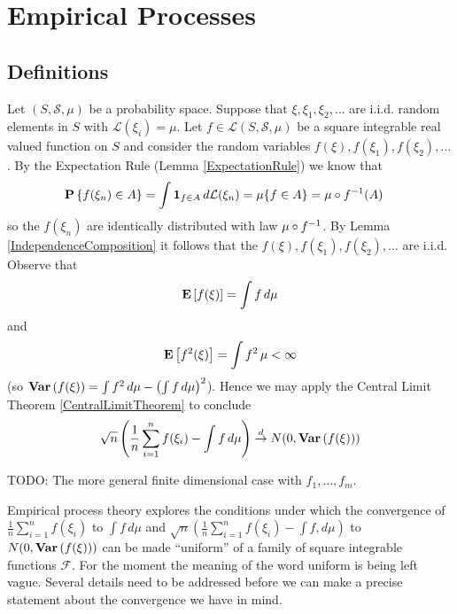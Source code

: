 \chapter{Empirical Processes}

\section{Definitions}

Let $(S, \mathcal{S}, \mu)$ be a probability space.  Suppose that $\xi, \xi_1, \xi_2, \dotsc$ are i.i.d. random elements in $S$ with $\mathcal{L}(\xi_i) = \mu$.  Let $f \in \mathcal{L}(S, \mathcal{S}, \mu)$ be a square integrable real valued function on $S$ and consider the random variables $f(\xi), f(\xi_1), f(\xi_2), \dotsc$.  By the Expectation Rule (Lemma \ref{ExpectationRule}) we know that 
\begin{align*}
\textbf{P}\left \{f(\xi_n) \in A \right \} &= \int \textbf{1}_{f \in A} \, d\mathcal{L}(\xi_n) = \mu \lbrace f \in A \rbrace = \mu \circ f^{-1}(A)
\end{align*}
so the $f(\xi_n)$ are identically distributed with law $\mu \circ f^{-1}$.  By Lemma \ref{IndependenceComposition} it follows that the $f(\xi), f(\xi_1), f(\xi_2), \dotsc$ are i.i.d.  Observe that 
\begin{align*}
\textbf{E}\left[f(\xi)\right] = \int f \, d\mu 
\end{align*}
and 
\begin{align*}
\textbf{E}\left[f^2(\xi)\right] = \int f^2 \, \mu < \infty
\end{align*}
(so $\textbf{Var} \left (f(\xi) \right ) = \int f^2 \, d\mu - \left(\int f \, d\mu\right)^2$).  Hence we may apply the Central Limit Theorem \ref{CentralLimitTheorem} to conclude 
\begin{align*}
\sqrt{n} \left( \frac{1}{n} \sum_{i=1}^n f(\xi_i) - \int f \, d\mu \right) \overset{d}\to N(0, \textbf{Var} \left (f(\xi) \right ) )
\end{align*}

TODO: The more general finite dimensional case with $f_1, \dotsc, f_m$.

Empirical process theory explores the conditions under which the convergence of $ \frac{1}{n} \sum_{i=1}^n f(\xi_i)$ to $\int f \, d\mu$ and $\sqrt{n} \left( \frac{1}{n} \sum_{i=1}^n f(\xi_i) - \int f , d\mu \right)$ to $N(0, \textbf{Var} \left (f(\xi) \right ))$ can be made ``uniform'' of a family of square integrable functions $\mathcal{F}$.  For the moment the meaning of the word uniform is being left vague.  Several details need to be addressed before we can make a precise statement about the convergence we have in mind.  

